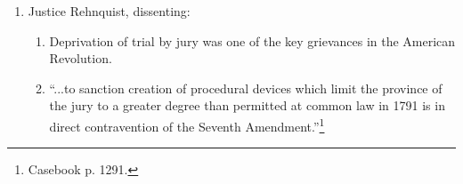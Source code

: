 \begin{enumerate}
\begin{enumerate}
\begin{enumerate}
        \end{enumerate}
    \end{enumerate}
    \item Justice Rehnquist, dissenting:
    \begin{enumerate}
        \item Deprivation of trial by jury was one of the key grievances in 
        the American Revolution.
        \item ``...to sanction creation of procedural devices which limit the 
        province of the jury to a greater degree than permitted at common law 
        in 1791 is in direct contravention of the Seventh 
        Amendment.''\footnote{Casebook p. 1291.}
    \end{enumerate}
\end{enumerate}
